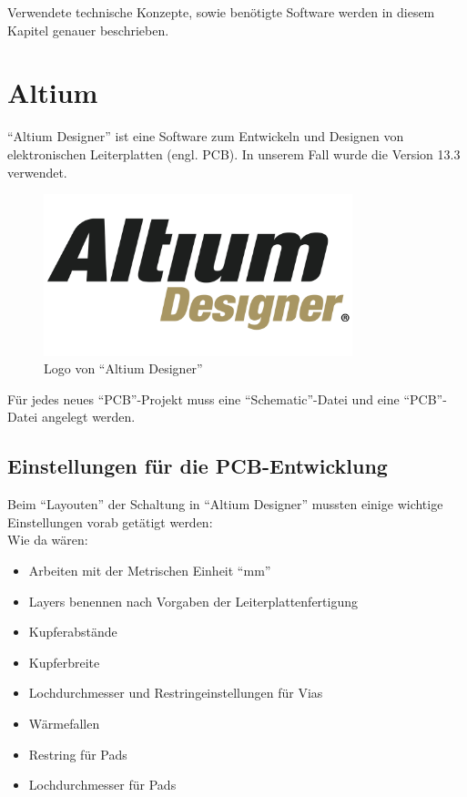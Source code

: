 Verwendete technische Konzepte, sowie benötigte Software werden in diesem Kapitel genauer beschrieben.

\section{Altium}\label{sec:3.1}
\enquote{Altium Designer} ist eine Software zum Entwickeln und Designen von elektronischen Leiterplatten (engl. PCB). In unserem Fall wurde die Version 13.3 verwendet. 
\begin{figure} [H]
	\centering
	\includegraphics[width=0.8\textwidth]{img/Grundlagen/Altium/ad_logo.png}
	\caption[Logo von \enquote{Altium Designer}]{Logo von \enquote{Altium Designer}\footnotemark}
	\label{fig:3.1.1}
\end{figure}
Für jedes neues \enquote{PCB}-Projekt muss eine \enquote{Schematic}-Datei und eine \enquote{PCB}-Datei angelegt werden.

\newpage
\subsection{Einstellungen für die PCB-Entwicklung}\label{subsec:3.1.1}
Beim \enquote{Layouten} der Schaltung in \enquote{Altium Designer} mussten einige wichtige Einstellungen vorab getätigt werden:\\
Wie da wären:
\begin{itemize}
	\item Arbeiten mit der Metrischen Einheit \enquote{mm}
	\item Layers benennen nach Vorgaben der Leiterplattenfertigung
	\item Kupferabstände
	\item Kupferbreite
	\item Lochdurchmesser und Restringeinstellungen für Vias
	\item Wärmefallen
	\item Restring für Pads
	\item Lochdurchmesser für Pads
\end{itemize}

